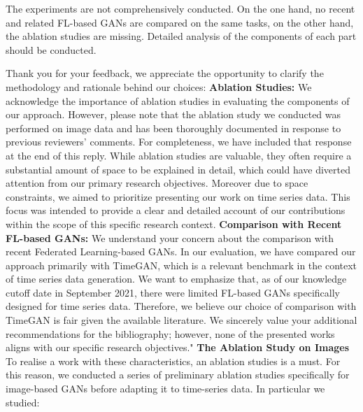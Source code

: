 \documentclass{article}
\begin{document}
\RC The experiments are not comprehensively conducted. On the one hand, no recent and related FL-based GANs are compared on the same tasks, on the other hand, the ablation studies are missing. Detailed analysis of the components of each part should be conducted. 

\AR Thank you for your feedback, we appreciate the opportunity to clarify the methodology and rationale behind our choices: \newline\newline
	\textbf{Ablation Studies:} We acknowledge the importance of ablation studies in evaluating the components of our approach. However, please note that the ablation study we conducted was performed on image data and has been thoroughly documented in response to previous reviewers' comments. For completeness, we have included that response at the end of this reply. While ablation studies are valuable, they often require a substantial amount of space to be explained in detail, which could have diverted attention from our primary research objectives. Moreover due to space constraints, we aimed to prioritize presenting our work on time series data. 
	This focus was intended to provide a clear and detailed account of our contributions within the scope of this specific research context.
 \newline\newline
	\textbf{Comparison with Recent FL-based GANs:} We understand your concern about the comparison with recent Federated Learning-based GANs. In our evaluation, we have compared our approach primarily with TimeGAN, which is a relevant benchmark in the context of time series data generation. We want to emphasize that, as of our knowledge cutoff date in September 2021, there were limited FL-based GANs specifically designed for time series data. Therefore, we believe our choice of comparison with TimeGAN is fair given the available literature. We sincerely value your additional recommendations for the bibliography; however, none of the presented works aligns with our specific research objectives."
\newline\newline
\textbf{The Ablation Study on Images}
\newline\newline
To realise a work with these characteristics, an ablation studies is a must. For this reason, we conducted a series of preliminary ablation studies specifically for image-based GANs before adapting it to time-series data. In particular we studied:
\end{document}
